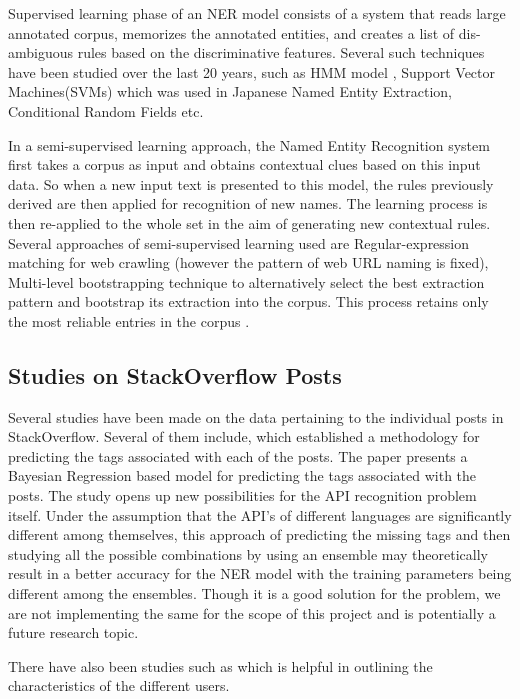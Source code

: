 \documentclass{sig-alternate-05-2015}
\begin{document}
Supervised learning phase of an NER model consists of a system that reads large annotated corpus, memorizes the annotated entities, and creates a list of dis-ambiguous rules based on the discriminative features. Several such techniques have been studied over the last 20 years, such as HMM model \cite{bickel1998efficient},  Support Vector Machines(SVMs) \cite{asahara2003japanese} which was used in Japanese Named Entity Extraction, Conditional Random Fields \cite{okanohara2006improving} etc.

In a semi-supervised learning approach, the Named Entity Recognition system first takes a corpus as input and obtains contextual clues based on this input data. So when a new input text is presented to this model, the rules previously derived are then applied for recognition of new names. The learning process is then re-applied to the whole set in the aim of generating new contextual rules. Several approaches of semi-supervised learning used are Regular-expression matching \cite{brin2012reprint} for web crawling (however the pattern of web URL naming is fixed), Multi-level bootstrapping technique to alternatively select the best extraction pattern and bootstrap its extraction into the corpus. This process retains only the most reliable entries in the corpus \cite{riloff1999learning}.


\subsection{Studies on StackOverflow Posts}
Several studies have been made on the data pertaining to the individual posts in StackOverflow. Several of them include, \cite{stanley2013predicting} which established a methodology for predicting the tags associated with each of the posts. The paper presents a Bayesian Regression based model for predicting the tags associated with the posts. The study opens up new possibilities for the API recognition problem itself. Under the assumption that the API's of different languages are significantly different among themselves, this approach of predicting the missing tags and then studying all the possible combinations by using an ensemble may theoretically result in a better accuracy for the NER model with the training parameters being different among the ensembles. Though it is a good solution for the problem, we are not implementing the same for the scope of this project and is potentially a future research topic.

There have also been studies such as \cite{bazelli2013personality} which is helpful in outlining the characteristics of the different users.
\end{document}
